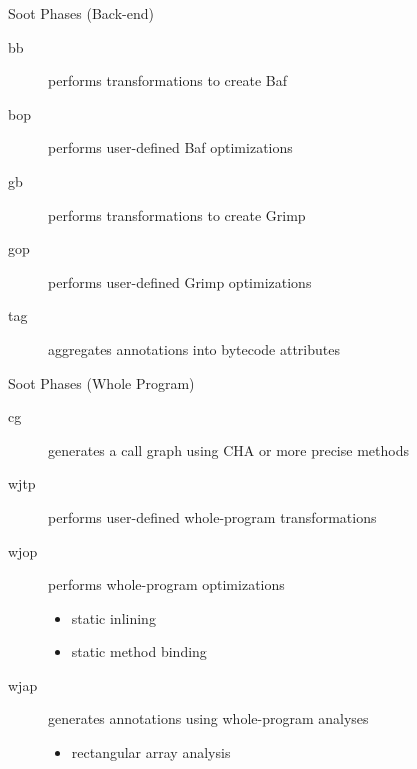 \begin{slide}{Soot Phases (Back-end)}
\begin{description}
\item[bb] performs transformations to create Baf
\item[bop] performs user-defined Baf optimizations
\end{description}
\begin{description}
\item[gb] performs transformations to create Grimp
\item[gop] performs user-defined Grimp optimizations
\end{description}
\begin{description}
\item[tag] aggregates annotations into bytecode attributes
\end{description}
\end{slide}


\begin{slide}{Soot Phases (Whole Program)}
\begin{description}
\item[cg] generates a call graph using CHA or more precise methods
\item[wjtp] performs user-defined whole-program transformations
\item[wjop] performs whole-program optimizations
\begin{itemize}
\item static inlining
\item static method binding
\end{itemize}
\item[wjap] generates annotations using whole-program analyses
\begin{itemize}
\item rectangular array analysis
\end{itemize}
\end{description}
\end{slide}



